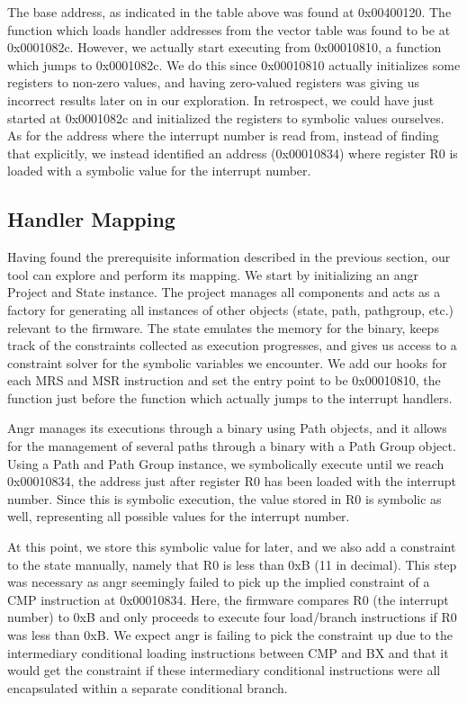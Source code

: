 \documentclass[letterpaper, 10 pt, conference]{ieeeconf}
\begin{document}
The base address, as indicated in the table above was found at 0x00400120. The function which loads handler addresses from the vector table was found to be at 0x0001082c. However, we actually start executing from 0x00010810, a function which jumps to 0x0001082c. We do this since 0x00010810 actually initializes some registers to non-zero values, and having zero-valued registers was giving us incorrect results later on in our exploration. In retrospect, we could have just started at 0x0001082c and initialized the registers to symbolic values ourselves. As for the address where the interrupt number is read from, instead of finding that explicitly, we instead identified an address (0x00010834) where register R0 is loaded with a symbolic value for the interrupt number.

\subsection{Handler Mapping} \label{mapping}
Having found the prerequisite information described in the previous section, our tool can explore and perform its mapping. We start by initializing an angr Project and State instance. The project manages all components and acts as a factory for generating all instances of other objects (state, path, pathgroup, etc.) relevant to the firmware. The state emulates the memory for the binary, keeps track of the constraints collected as execution progresses, and gives us access to a constraint solver for the symbolic variables we encounter. We add our hooks for each MRS and MSR instruction and set the entry point to be 0x00010810, the function just before the function which actually jumps to the interrupt handlers.

Angr manages its executions through a binary using Path objects, and it allows for the management of several paths through a binary with a Path Group object. Using a Path and Path Group instance, we symbolically execute until we reach 0x00010834, the address just after register R0 has been loaded with the interrupt number. Since this is symbolic execution, the value stored in R0 is symbolic as well, representing all possible values for the interrupt number. 

At this point, we store this symbolic value for later, and we also add a constraint to the state manually, namely that R0 is less than 0xB (11 in decimal). This step was necessary as angr seemingly failed to pick up the implied constraint of a CMP instruction at 0x00010834. Here, the firmware compares R0 (the interrupt number) to 0xB and only proceeds to execute four load/branch instructions if R0 was less than 0xB. We expect angr is failing to pick the constraint up due to the intermediary conditional loading instructions between CMP and BX and that it would get the constraint if these intermediary conditional instructions were all encapsulated within a separate conditional branch.
\end{document}
